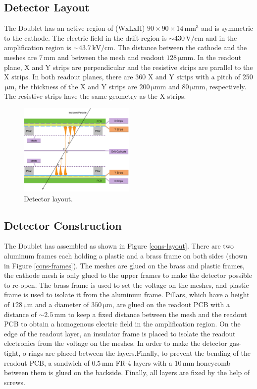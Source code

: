 \documentclass[a4paper,11pt]{article}
\newcommand{\myunit}[1]{$\, \mathrm{#1}$}
\begin{document}
\subsection{Detector Layout}
The Doublet has an active region of (WxLxH) $90 \times 90 \times 14$\myunit{mm^3} and is symmetric to the cathode. The electric field in the drift region is $\sim 430$\myunit{V/cm} and in the amplification region is $\sim 43.7$\myunit{kV/cm}. The distance between the cathode and the meshes are $7$\myunit{mm} and between the mesh and readout $128$\myunit{\mu mm}. In the readout plane, X and Y strips are perpendicular and the resistive strips are parallel to the X strips. In both readout planes, there are 360 X and Y strips with a pitch of 250\myunit{\mu m}, the thickness of the X and Y strips are $200$\myunit{\mu mm} and $80$\myunit{\mu mm}, respectively. The resistive strips have the same geometry as the X strips. 


\begin{figure}[h!]
	\centering
    \includegraphics[keepaspectratio=true, width=0.5\textwidth]{Figures/Doublet.png}
	\caption{Detector layout.}
	\label{doublet-layout}
\end{figure}


\subsection{Detector Construction}

The Doublet has assembled as shown in Figure \ref{cons-layout}. There are two aluminum frames each holding a plastic and a brass frame on both sides (shown in Figure \ref{cons-frames}). The meshes are glued on the brass and plastic frames, the cathode mesh is only glued to the upper frames to make the detector possible to re-open. The brass frame is used to set the voltage on the meshes, and plastic frame is used to isolate it from the aluminum frame. Pillars, which have a height of $128$\myunit{\mu m} and a diameter of $350$\myunit{\mu m}, are glued on the readout PCB with a distance of $\sim 2.5$\myunit{mm} to keep a fixed distance between the mesh and the readout PCB to obtain a homogenous electric field in the amplification region. On the edge of the readout layer, an insulator frame is placed to isolate the readout electronics from the voltage on the meshes. In order to make the detector gas-tight, o-rings are placed between the layers.Finally, to prevent the bending of the readout PCB, a sandwich of $0.5$\myunit{mm} FR-4 layers with a $10$\myunit{mm} honeycomb between them is glued on the backside. Finally, all layers are fixed by the help of screws.
\end{document}
